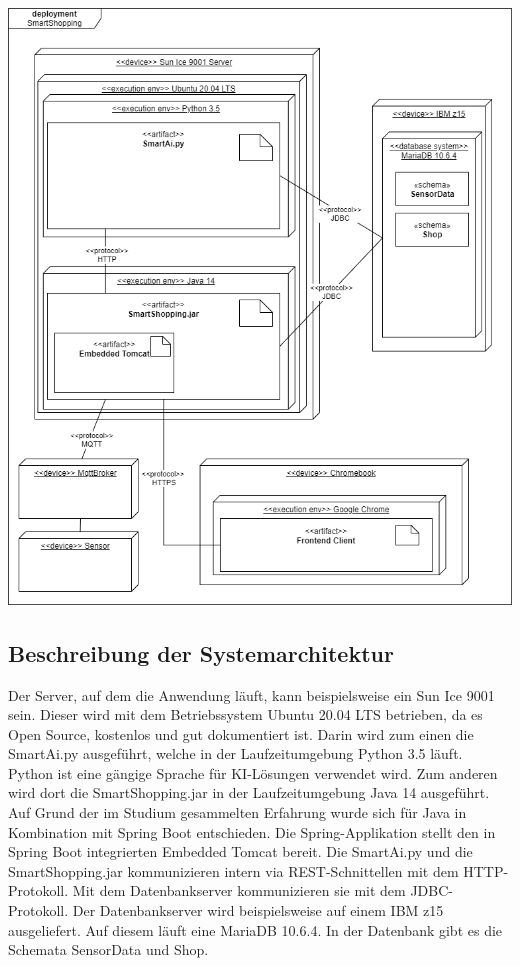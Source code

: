 \documentclass[runningheads]{llncs}
\begin{document}
\includegraphics[width=\linewidth]{images/deployment_diagram}


\subsection{Beschreibung der Systemarchitektur}


Der Server, auf dem die Anwendung läuft, kann beispielsweise ein Sun Ice 9001 sein.
Dieser wird mit dem Betriebssystem Ubuntu 20.04 LTS betrieben, da es Open Source, kostenlos und gut dokumentiert ist.
Darin wird zum einen die SmartAi.py ausgeführt, welche in der Laufzeitumgebung Python 3.5 läuft. 
Python ist eine gängige Sprache für KI-Lösungen verwendet wird.
Zum anderen wird dort die SmartShopping.jar in der Laufzeitumgebung Java 14 ausgeführt.
Auf Grund der im Studium gesammelten Erfahrung wurde sich für Java in Kombination mit Spring Boot entschieden.
Die Spring-Applikation stellt den in Spring Boot integrierten Embedded Tomcat bereit.
Die SmartAi.py und die SmartShopping.jar kommunizieren intern via REST-Schnittellen mit dem HTTP-Protokoll.
Mit dem Datenbankserver kommunizieren sie mit dem JDBC-Protokoll.
Der Datenbankserver wird beispielsweise auf einem IBM z15 ausgeliefert.
Auf diesem läuft eine MariaDB 10.6.4.
In der Datenbank gibt es die Schemata SensorData und Shop.
\end{document}

